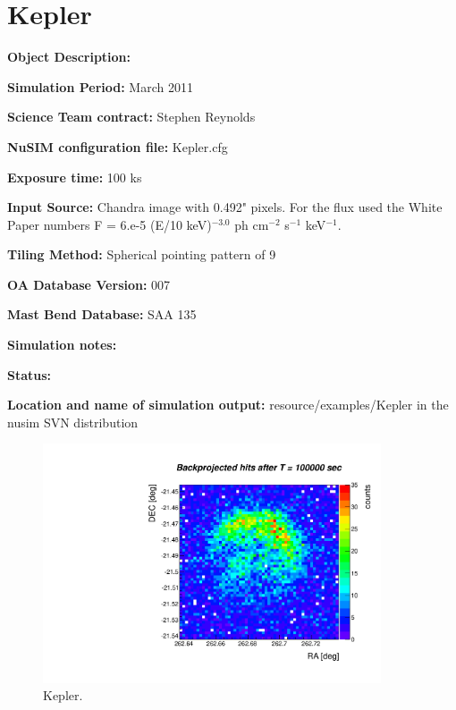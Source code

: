 
\newpage

\section{Kepler}

\textbf{Object Description:}

\textbf{Simulation Period:} March 2011

\textbf{Science Team contract:} Stephen Reynolds

\textbf{NuSIM configuration file:} Kepler.cfg

\textbf{Exposure time:} 100 ks

\textbf{Input Source:} Chandra image with 0.492" pixels.  For the flux used the White Paper numbers F = 6.e-5 (E/10 keV)$^{-3.0}$ ph cm$^{-2}$ s$^{-1}$ keV$^{-1}$.

\textbf{Tiling Method:} Spherical pointing pattern of 9

\textbf{OA Database Version:} 007

\textbf{Mast Bend Database:} SAA 135

\textbf{Simulation notes:} 

\textbf{Status:} 

\textbf{Location and name of simulation output:} resource/examples/Kepler in the nusim SVN distribution

\begin{figure}[h]
\begin{center}
\includegraphics[width=10cm]{Kepler/Kepler.pdf}  %
\caption{Kepler.}
\label{kepler} 
\end{center}
\end{figure}

